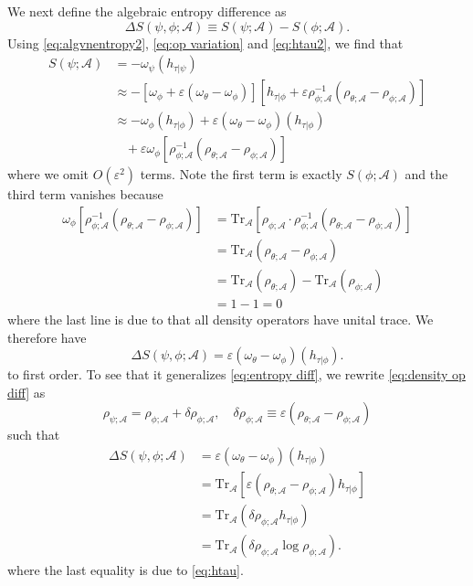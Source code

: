 \documentclass[a4paper,11pt]{article}
\renewcommand{\=}[1]{\stackrel{#1}{=}} %
\def\A{\mathcal{A}}
\def\Tr{\text{Tr}}
\begin{document}
We next define the algebraic entropy difference as
\begin{equation}
	\Delta S(\psi,\phi;\A)\equiv S(\psi;\A)-S(\phi;\A).
\end{equation}
Using \eqref{eq:algvnentropy2}, \eqref{eq:op variation} and \eqref{eq:htau2}, we find that
\begin{equation}
	\begin{aligned}
		S(\psi;\A)&=-\omega_\psi(h_{\tau|\psi})\\
		&\approx-\left[\omega_\phi+\varepsilon(\omega_\theta-\omega_\phi)\right]\left[ h_{\tau|\phi}+\varepsilon \rho_{\phi;\A}^{-1}(\rho_{\theta;\A}-\rho_{\phi;\A})\right]\\
		&\approx -\omega_\phi(h_{\tau|\phi})+\varepsilon(\omega_\theta-\omega_\phi)(h_{\tau|\phi})\\
		&~~~~+\varepsilon \omega_\phi\left[ \rho_{\phi;\A}^{-1}(\rho_{\theta;\A}-\rho_{\phi;\A})\right]
	\end{aligned}
\end{equation}
where we omit $O(\varepsilon^2)$ terms. Note the first term is exactly $S(\phi;\A)$ and the third term vanishes because
\begin{equation}
	\begin{aligned}
		\omega_\phi\left[ \rho_{\phi;\A}^{-1}(\rho_{\theta;\A}-\rho_{\phi;\A})\right]&=\Tr_{\A}\left[\rho_{\phi;\A}\cdot \rho_{\phi;\A}^{-1}(\rho_{\theta;\A}-\rho_{\phi;\A})\right]\\
		&=\Tr_{\A}(\rho_{\theta;\A}-\rho_{\phi;\A})\\
		&=\Tr_{\A}(\rho_{\theta;\A})-\Tr_{\A}(\rho_{\phi;\A})\\
		&=1-1=0
	\end{aligned}
\end{equation}
where the last line is due to that all density operators have unital trace. We therefore have
\begin{equation}\label{eq:entropy diff2}
	\Delta S(\psi,\phi;\A)=\varepsilon(\omega_\theta-\omega_\phi)(h_{\tau|\phi}).
\end{equation}
to first order. To see that it generalizes \eqref{eq:entropy diff}, we rewrite \eqref{eq:density op diff} as
\begin{equation}\label{eq:density op diff2}
	\rho_{\psi;\A}=\rho_{\phi;\A}+\delta\rho_{\phi;\A},\quad \delta\rho_{\phi;\A}\equiv \varepsilon(\rho_{\theta;\A}-\rho_{\phi;\A})
\end{equation}
such that
\begin{equation}
	\begin{aligned}
		\Delta S(\psi,\phi;\A)&=\varepsilon(\omega_\theta-\omega_\phi)(h_{\tau|\phi})\\
		&=\Tr_{\A}\left[ \varepsilon( \rho_{\theta;\A}-\rho_{\phi;\A}) h_{\tau|\phi}\right]\\
		&=\Tr_{\A}\left( \delta\rho_{\phi;\A}h_{\tau|\phi}\right)\\
		&=\Tr_{\A}\left( \delta\rho_{\phi;\A}\log \rho_{\phi;\A}\right).
	\end{aligned}
\end{equation}
where the last equality is due to \eqref{eq:htau}.
\end{document}
